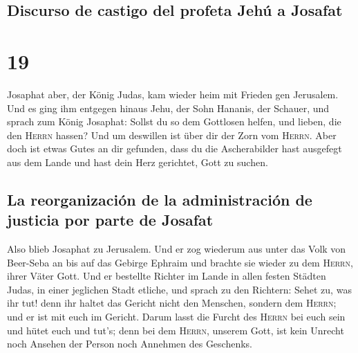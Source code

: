 \hypertarget{discurso-de-castigo-del-profeta-jehuxfa-a-josafat}{%
\subsection{Discurso de castigo del profeta Jehú a
Josafat}\label{discurso-de-castigo-del-profeta-jehuxfa-a-josafat}}

\hypertarget{section-18}{%
\section{19}\label{section-18}}

 Josaphat aber, der König Judas, kam wieder heim mit
Frieden gen Jerusalem.  Und es ging ihm entgegen hinaus
Jehu, der Sohn Hananis, der Schauer, und sprach zum König Josaphat:
Sollst du so dem Gottlosen helfen, und lieben, die den \textsc{Herrn}
hassen? Und um deswillen ist über dir der Zorn vom \textsc{Herrn}.
 Aber doch ist etwas Gutes an dir gefunden, dass du die
Ascherabilder hast ausgefegt aus dem Lande und hast dein Herz gerichtet,
Gott zu suchen.

\hypertarget{la-reorganizaciuxf3n-de-la-administraciuxf3n-de-justicia-por-parte-de-josafat}{%
\subsection{La reorganización de la administración de justicia por parte
de
Josafat}\label{la-reorganizaciuxf3n-de-la-administraciuxf3n-de-justicia-por-parte-de-josafat}}

 Also blieb Josaphat zu Jerusalem. Und er zog wiederum aus
unter das Volk von Beer-Seba an bis auf das Gebirge Ephraim und brachte
sie wieder zu dem \textsc{Herrn}, ihrer Väter Gott.  Und
er bestellte Richter im Lande in allen festen Städten Judas, in einer
jeglichen Stadt etliche,  und sprach zu den Richtern:
Sehet zu, was ihr tut! denn ihr haltet das Gericht nicht den Menschen,
sondern dem \textsc{Herrn}; und er ist mit euch im Gericht.
 Darum lasst die Furcht des \textsc{Herrn} bei euch sein
und hütet euch und tut's; denn bei dem \textsc{Herrn}, unserem Gott, ist
kein Unrecht noch Ansehen der Person noch Annehmen des Geschenks.

